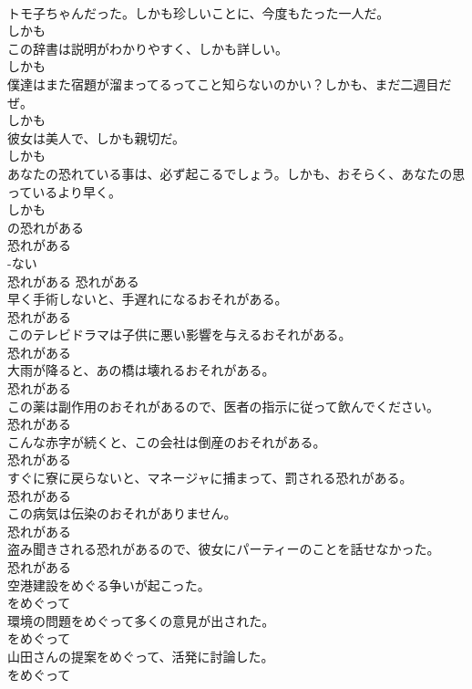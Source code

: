 \documentclass[8pt]{extreport}
\begin{document}
\begin{CJK}{UTF8}{min}
\\	トモ子ちゃんだった。しかも珍しいことに、今度もたった一人だ。	
\\	しかも
\\	この辞書は説明がわかりやすく、しかも詳しい。	
\\	しかも
\\	僕達はまた宿題が溜まってるってこと知らないのかい？しかも、まだ二週目だぜ。	
\\	しかも
\\	彼女は美人で、しかも親切だ。	
\\	しかも
\\	あなたの恐れている事は、必ず起こるでしょう。しかも、おそらく、あなたの思っているより早く。	
\\	しかも
\\	の恐れがある	
\\	恐れがある	
\\	-ない
\\	恐れがある	恐れがある
\\	早く手術しないと、手遅れになるおそれがある。	
\\	恐れがある
\\	このテレビドラマは子供に悪い影響を与えるおそれがある。	
\\	恐れがある
\\	大雨が降ると、あの橋は壊れるおそれがある。	
\\	恐れがある
\\	この薬は副作用のおそれがあるので、医者の指示に従って飲んでください。	
\\	恐れがある
\\	こんな赤字が続くと、この会社は倒産のおそれがある。	
\\	恐れがある
\\	すぐに寮に戻らないと、マネージャに捕まって、罰される恐れがある。	
\\	恐れがある
\\	この病気は伝染のおそれがありません。	
\\	恐れがある
\\	盗み聞きされる恐れがあるので、彼女にパーティーのことを話せなかった。	
\\	恐れがある
\\	空港建設をめぐる争いが起こった。	
\\	をめぐって
\\	環境の問題をめぐって多くの意見が出された。	
\\	をめぐって
\\	山田さんの提案をめぐって、活発に討論した。	
\\	をめぐって

\end{CJK}
\end{document}

